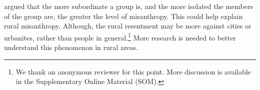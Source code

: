 \documentclass[11pt, letterpaper]{article}
\begin{document}
\begin{spacing}{1.4}

{
\citet{smith97} argued that the more subordinate a group is, and the more
isolated the members of the group are, the greater the level of misanthropy. %
 This could help explain rural misanthropy.  Although, the rural resentment may be more against cities or urbanites, rather than people in general.\footnote{We thank an anonymous reviewer for this point. More discussion is available in the Supplementary Online Material (SOM).}
  More research is needed to better understand this phenomenon in rural areas. %
}


\end{spacing}
\end{document}
